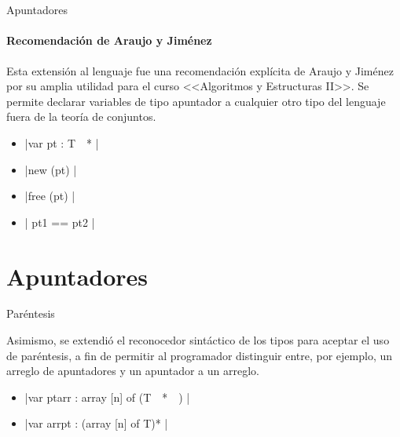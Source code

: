 \section{ }

\begin{frame}{Apuntadores}
\framesubtitle{Recomendación de Araujo y Jiménez}
Esta extensión al lenguaje fue una recomendación explícita de Araujo y Jiménez
por su amplia utilidad para el curso <<Algoritmos y Estructuras II>>. Se permite
declarar variables de tipo apuntador a cualquier otro tipo del lenguaje fuera 
de la teoría de conjuntos.

\begin{itemize}
  \item{ \ingra|var pt : T~~* | }
  \item{ \ingra|new  (pt) | }
  \item{ \ingra|free (pt) | }
  \item{ \ingra| pt1 == pt2 | }
\end{itemize}
\end{frame}

\section{Apuntadores}

\begin{frame}{Paréntesis}

Asimismo, se extendió el reconocedor sintáctico de los tipos para aceptar el 
uso de paréntesis, a fin de permitir al programador distinguir entre, por 
ejemplo, un arreglo de apuntadores y un apuntador a un arreglo.

\begin{itemize}
  \item{ \ingra|var ptarr : array [n] of (T~~*~~) | }
  \item{ \ingra|var arrpt : (array [n] of T)* | }
\end{itemize}
\end{frame}

